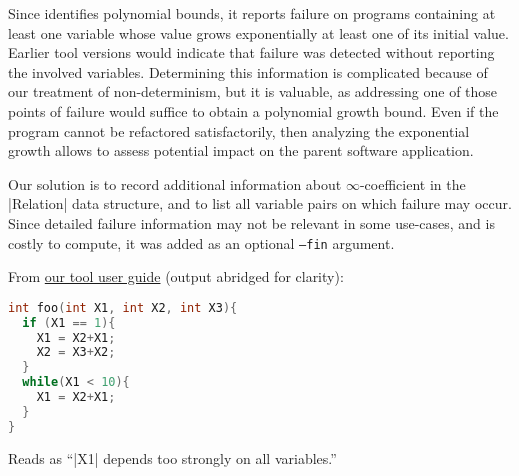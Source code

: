 \documentclass[runningheads]{llncs}
\begin{document}
Since \pymwp identifies polynomial bounds, it reports failure on programs containing at least one variable whose value grows exponentially \wrt at least one of its initial value.
Earlier tool versions would indicate that failure was detected without reporting the involved variables.
Determining this information is complicated because of our treatment of non-determinism, but it is valuable, as addressing one of those points of failure would suffice to obtain a polynomial growth bound.
Even if the program cannot be refactored satisfactorily, then analyzing the exponential growth allows to assess potential impact on the parent software application.

Our solution is to record additional information about $\infty$-coefficient in the \pr|Relation| data structure, and to list all variable pairs on which failure may occur.
Since detailed failure information may not be relevant in some use-cases, and is costly to compute, it was added as an optional \texttt{---fin} argument.

\begin{example}
From \href{https://statycc.github.io/.github/pymwp/\#inf-prog}{our tool user guide} (output abridged for clarity): 

\noindent
\begin{minipage}[b][][b]{0.65\textwidth}
\begin{lstlisting}[language=C]
int foo(int X1, int X2, int X3){
  if (X1 == 1){
    X1 = X2+X1;
    X2 = X3+X2;
  }
  while(X1 < 10){
    X1 = X2+X1;
  }
}
\end{lstlisting}
\end{minipage}
\hspace{-11em}
\begin{minipage}[b][][t]{0.65\textwidth}
Reads as \enquote{\prc|X1| depends too strongly on all variables.}
\end{minipage}
\end{example}
\end{document}
